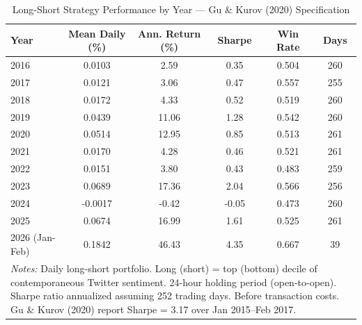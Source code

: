 \begin{table}[htbp]
\centering
\caption{Long-Short Strategy Performance by Year --- Gu \& Kurov (2020) Specification}
\label{tab:gk_ls_annual}
\begin{tabular}{lccccc}
\hline\hline
Year & Mean Daily (\%) & Ann. Return (\%) & Sharpe & Win Rate & Days \\
\hline
  2016 & 0.0103 & 2.59 & 0.35 & 0.504 & 260 \\
  2017 & 0.0121 & 3.06 & 0.47 & 0.557 & 255 \\
  2018 & 0.0172 & 4.33 & 0.52 & 0.519 & 260 \\
  2019 & 0.0439 & 11.06 & 1.28 & 0.542 & 260 \\
  2020 & 0.0514 & 12.95 & 0.85 & 0.513 & 261 \\
  2021 & 0.0170 & 4.28 & 0.46 & 0.521 & 261 \\
  2022 & 0.0151 & 3.80 & 0.43 & 0.483 & 259 \\
  2023 & 0.0689 & 17.36 & 2.04 & 0.566 & 256 \\
  2024 & -0.0017 & -0.42 & -0.05 & 0.473 & 260 \\
  2025 & 0.0674 & 16.99 & 1.61 & 0.525 & 261 \\
  2026 (Jan-Feb) & 0.1842 & 46.43 & 4.35 & 0.667 & 39 \\
\hline\hline
\multicolumn{6}{p{0.95\linewidth}}{\footnotesize \textit{Notes:} Daily long-short portfolio. Long (short) = top (bottom) decile of contemporaneous Twitter sentiment. 24-hour holding period (open-to-open). Sharpe ratio annualized assuming 252 trading days. Before transaction costs. Gu \& Kurov (2020) report Sharpe = 3.17 over Jan 2015--Feb 2017.} \\
\end{tabular}
\end{table}